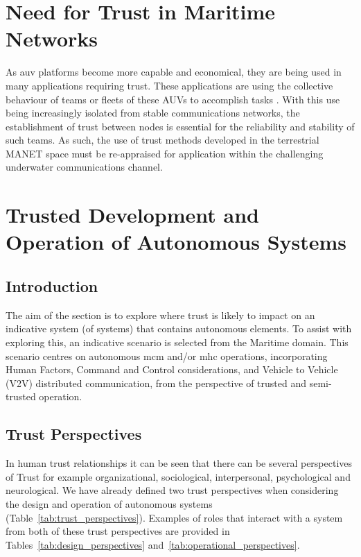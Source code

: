  \section{Need for Trust in Maritime Networks}
 As \acrfull{auv} platforms become more capable and economical, they are being used in many applications requiring trust.
 These applications are using the collective behaviour of teams or fleets of these AUVs to accomplish tasks \cite{Caiti2011}.
 With this use being increasingly isolated from stable communications networks, the establishment of trust between nodes is essential for the reliability and stability of such teams.
 As such, the use of trust methods developed in the terrestrial MANET space must be re-appraised for application within the challenging underwater communications channel.
 
 \section{Trusted Development and Operation of Autonomous Systems}
 
 \subsection{Introduction}
 
 The aim of the section is to explore where trust is likely to impact on an indicative system (of systems) that contains autonomous elements.
 To assist with exploring this, an indicative scenario is selected from the Maritime domain.
 This scenario centres on autonomous \acrfull{mcm} and/or \acrfull{mhc} operations, incorporating Human Factors, Command and Control considerations, and Vehicle to Vehicle (V2V) distributed communication, from the perspective of trusted and semi-trusted operation.
 
 
 \subsection{Trust Perspectives}
 
 In human trust relationships it can be seen that there can be several perspectives of Trust for example organizational, sociological, interpersonal, psychological and neurological\cite{Lee2004}.
 We have already defined two trust perspectives when considering the design and operation of autonomous systems (Table~\ref{tab:trust_perspectives}).
 Examples of roles that interact with a system from both of these trust perspectives are provided in Tables~\ref{tab:design_perspectives} and~\ref{tab:operational_perspectives}.
 
